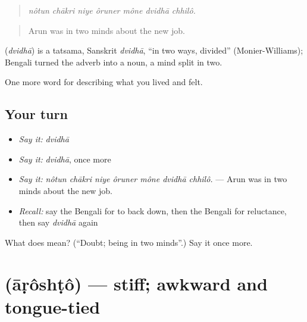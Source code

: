\begin{quote}
      
\end{quote}

\begin{quote}
\emph{nôtun chākri niye ôruner mône dvidhā chhilô.}
\end{quote}

\begin{quote}
Arun was in two minds about the new job.
\end{quote}

\begin{cousinweb}
\textbf{} (\emph{dvidhā}) is a tatsama, Sanskrit \emph{dvidhā}, \textquotedblleft{}in two ways, divided\textquotedblright{} (Monier-Williams); Bengali turned the adverb into a noun, a mind split in two.
\end{cousinweb}

\begin{grammarlens}[title={What you've built}]
One more word for describing what you lived and felt.
\end{grammarlens}

\subsection*{Your turn}
\begin{itemize}
\raggedright
  \item \emph{Say it:} \emph{dvidhā}
  \item \emph{Say it:} \emph{dvidhā}, once more
  \item \emph{Say it:} \emph{nôtun chākri niye ôruner mône dvidhā chhilô.} — Arun was in two minds about the new job.
  \item \emph{Recall:} say the Bengali for to back down, then the Bengali for reluctance, then say \emph{dvidhā} again
\end{itemize}

\begin{tcolorbox}[breakable,colback=teal!4,colframe=teal!35!black,title={Before you move on}]
What does  mean? (\textquotedblleft{}Doubt; being in two minds\textquotedblright{}.) Say it once more.
\end{tcolorbox}
\section[\texorpdfstring{\bn{আড়ষ্ট} (āṛôshṭô)}{আড়ষ্ট (āṛôshṭô)}]{ (āṛôshṭô) — stiff; awkward and tongue-tied}


